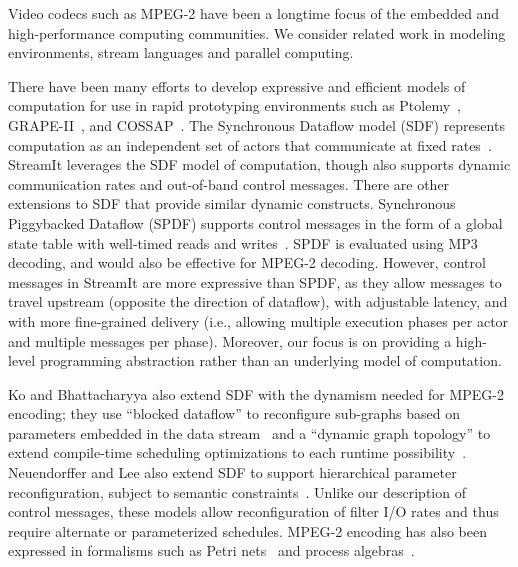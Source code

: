 \vspace{-6pt}


Video codecs such as MPEG-2 have been a longtime focus of the embedded
and high-performance computing communities.  We consider related work
in modeling environments, stream languages and parallel computing.

There have been many efforts to develop expressive and efficient
models of computation for use in rapid prototyping environments such
as Ptolemy~\cite{ptolemy03overview}, GRAPE-II~\cite{grape-ii}, and
COSSAP~\cite{cossap}.  The Synchronous Dataflow model (SDF) represents
computation as an independent set of actors that communicate at fixed
rates~\cite{lee87static}.  StreamIt leverages the SDF model of
computation, though also supports dynamic communication rates and
out-of-band control messages.  There are other extensions to SDF that
provide similar dynamic constructs.  Synchronous Piggybacked Dataflow
(SPDF) supports control messages in the form of a global state table
with well-timed reads and writes~\cite{park99spdf2,park02spdf3}.  SPDF
is evaluated using MP3 decoding, and would also be effective for
MPEG-2 decoding.  However, control messages in StreamIt are more
expressive than SPDF, as they allow messages to travel upstream
(opposite the direction of dataflow), with adjustable latency, and
with more fine-grained delivery (i.e., allowing multiple execution
phases per actor and multiple messages per phase).  Moreover, our
focus is on providing a high-level programming abstraction rather than
an underlying model of computation.

Ko and Bhattacharyya also extend SDF with the dynamism needed for
MPEG-2 encoding; they use ``blocked dataflow'' to reconfigure
sub-graphs based on parameters embedded in the data
stream~\cite{bhatta05block} and a ``dynamic graph topology'' to extend
compile-time scheduling optimizations to each runtime
possibility~\cite{ko05dgt}. Neuendorffer and Lee also extend SDF to
support hierarchical parameter reconfiguration, subject to semantic
constraints~\cite{neuendorffer04hierarchical}.  Unlike our description
of control messages, these models allow reconfiguration of filter I/O
rates and thus require alternate or parameterized schedules.  MPEG-2
encoding has also been expressed in formalisms such as Petri
nets~\cite{valero02petri} and process algebras~\cite{pelayo01rosa}.

